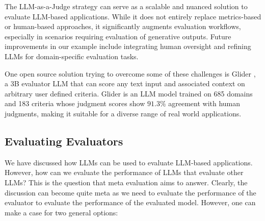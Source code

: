The LLM-as-a-Judge strategy can serve as a scalable and nuanced solution to evaluate LLM-based applications. While it does not entirely replace metrics-based or human-based approaches, it significantly augments evaluation workflows, especially in scenarios requiring evaluation of generative outputs. Future improvements in our example include integrating human oversight and refining LLMs for domain-specific evaluation tasks.

One open source solution trying to overcome some of these challenges is Glider , a 3B evaluator LLM that can score any text input and associated context on arbitrary user defined criteria. Glider is an LLM model trained on 685 domains and 183 criteria whose judgment scores show $91.3\%$ agreement with human judgments, making it suitable for a diverse range of real world applications.

\subsection{Evaluating Evaluators}

We have discussed how LLMs can be used to evaluate LLM-based applications. However, how can we evaluate the performance of LLMs that evaluate other LLMs? This is the question that meta evaluation aims to answer. Clearly, the discussion can become quite meta as we need to evaluate the performance of the evaluator to evaluate the performance of the evaluated model. However, one can make a case for two general options:

